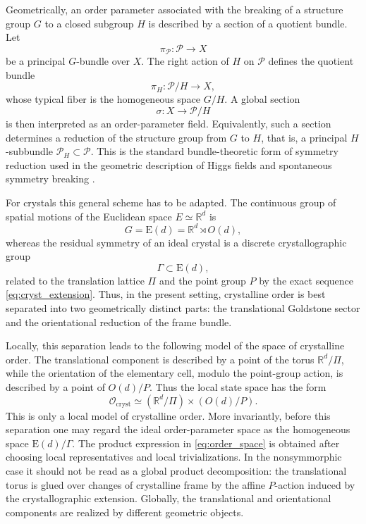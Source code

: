 \documentclass[11pt]{amsart}
\theoremstyle{plain}
\theoremstyle{definition}
\theoremstyle{remark}
\begin{document}
Geometrically, an order parameter associated with the breaking of a structure group \(G\) to a closed subgroup \(H\) is described by a section of a quotient bundle. 
Let
\[
\pi_{\mathcal P} : \mathcal P \to X
\]
be a principal \(G\)-bundle over \(X\).
The right action of \(H\) on \(\mathcal P\) defines the quotient bundle
\begin{equation}
	\pi_H:\mathcal P/H\longrightarrow X,
	\label{eq:quotient_bundle}
\end{equation}
whose typical fiber is the homogeneous space \(G/H\). 
A global section
\begin{equation}
	\sigma:X\longrightarrow \mathcal P/H
	\label{eq:general_order_parameter}
\end{equation}
is then interpreted as an order-parameter field. 
Equivalently, such a section determines a reduction of the structure group from \(G\) to \(H\), that is, a principal \(H\)-subbundle \(\mathcal P_H\subset\mathcal P\). 
This is the standard bundle-theoretic form of symmetry reduction used in the geometric description of Higgs fields and spontaneous symmetry breaking \cite{HusemollerFibreBundles,KobayashiNomizu1,SardanashvilyBook,GiachettaBook,BraunerBook}.

\medskip

For crystals this general scheme has to be adapted. 
The continuous group of spatial motions of the Euclidean space \(E\simeq \mathbb R^d\) is
\begin{equation}
	G=\mathrm E(d)=\mathbb R^d\rtimes O(d),
	\label{eq:euclidean_group}
\end{equation}
whereas the residual symmetry of an ideal crystal is a discrete crystallographic group
\[
\Gamma\subset \mathrm E(d),
\]
related to the translation lattice \(\Pi\) and the point group \(P\) by the exact sequence \eqref{eq:cryst_extension}. 
Thus, in the present setting, crystalline order is best separated into two geometrically distinct parts: the translational Goldstone sector and the orientational reduction of the frame bundle.

Locally, this separation leads to the following model of the space of crystalline order. 
The translational component is described by a point of the torus \(\mathbb R^d/\Pi\), while the orientation of the elementary cell, modulo the point-group action, is described by a point of \(O(d)/P\). 
Thus the local state space has the form
\begin{equation}
	\mathcal O_{\mathrm{cryst}}
	\simeq
	(\mathbb R^d/\Pi)\times (O(d)/P).
	\label{eq:order_space}
\end{equation}
This is only a local model of crystalline order. 
More invariantly, before this separation one may regard the ideal order-parameter space as the homogeneous space \(\mathrm E(d)/\Gamma\). The product expression in \eqref{eq:order_space} is obtained after choosing local representatives and local trivializations. In the nonsymmorphic case it should not be read as a global product decomposition: the translational torus is glued over changes of crystalline frame by the affine \(P\)-action induced by the crystallographic extension. 
Globally, the translational and orientational components are realized by different geometric objects.
\end{document}
